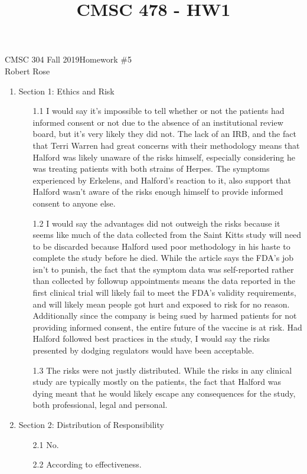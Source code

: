 \documentclass[12pt]{article}
\title{CMSC 478 - HW1}
\begin{document}
CMSC 304 Fall 2019\hfill Homework \#5\\
Robert Rose

\hrulefill

\begin{enumerate}
\item Section 1: Ethics and Risk
  \begin{enumerate}
  \item[1.1] I would say it's impossible to tell whether or not the patients had
        informed consent or not due to the absence of an institutional review
        board, but it's very likely they did not. The lack of an IRB, and the 
        fact that Terri Warren had great concerns with their methodology means
        that Halford was likely unaware of the risks himself, especially
        considering he was treating patients with both strains of Herpes. The
        symptoms experienced by Erkelens, and Halford's reaction to it, also 
        support that Halford wasn't aware of the risks enough himself to
        provide informed consent to anyone else.
        
  \item[1.2] I would say the advantages did not outweigh the risks because it seems
        like much of the data collected from the Saint Kitts study will need to
        be discarded because Halford used poor methodology in his haste to 
        complete the study before he died. While the article says the FDA's job
        isn't to punish, the fact that the symptom data was self-reported rather
        than collected by followup appointments means the data reported in the
        first clinical trial will likely fail to meet the FDA's validity 
        requirements, and will likely mean people got hurt and exposed to risk
        for no reason. Additionally since the company is being sued by harmed 
        patients for not providing informed consent, the entire future of the
        vaccine is at risk. Had Halford followed best practices in the study, 
        I would say the risks presented by dodging regulators would have been
        acceptable.
  \item[1.3] The risks were not justly distributed. While the risks in any clinical
        study are typically mostly on the patients, the fact that Halford was
        dying meant that he would likely escape any consequences for the study,
        both professional, legal and personal.
  \end{enumerate}

\item Section 2: Distribution of Responsibility
  \begin{enumerate}
    \item[2.1] No.
    \item[2.2] According to effectiveness.
  \end{enumerate}

\end{enumerate}
\end{document}
